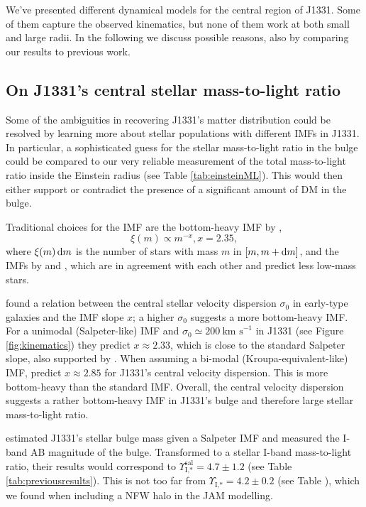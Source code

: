 We've presented different dynamical models for the central region of J1331. Some of them capture the observed kinematics, but none of them work at both small and large radii. In the following we discuss possible reasons, also by comparing our results to previous work.

\subsection{On J1331's central stellar mass-to-light ratio} \label{sec:MLdiscussion}

Some of the ambiguities in recovering J1331's matter distribution could be resolved by learning more about stellar populations with different IMFs in J1331. In particular, a sophisticated guess for the stellar mass-to-light ratio in the bulge could be compared to our very reliable measurement of the total mass-to-light ratio inside the Einstein radius (see Table \ref{tab:einsteinML}). This would then either support or contradict the presence of a significant amount of DM in the bulge.

Traditional choices for the IMF are the bottom-heavy IMF by \citet{Salpeter1955},
$$\xi(m) \propto m^{-x}, x=2.35,$$
where $\xi(m) \mathop{}\!\mathrm{d} m$ is the number of stars with mass $m$ in $[m,m+\mathop{}\!\mathrm{d} m]$, and the IMFs by \citet{2002Sci...295...82K} and \citet{Chabrier2003}, which are in agreement with each other and predict less low-mass stars.

\citet{Ferreras} found a relation between the central stellar velocity dispersion $\sigma_0$ in early-type galaxies and the IMF slope $x$; a higher $\sigma_0$ suggests a more bottom-heavy IMF. For a unimodal (Salpeter-like) IMF and $\sigma_0 \simeq 200~\text{km s}^{-1}$ in J1331 (see Figure \ref{fig:kinematics}) they predict $x \approx 2.33$, which is close to the standard Salpeter slope, also supported by \citet{2014MNRAS.438.1483S}. When assuming a bi-modal (Kroupa-equivalent-like) IMF, \citet{Ferreras} predict $x \approx 2.85$ for J1331's central velocity dispersion. This is more bottom-heavy than the standard \citet{2002Sci...295...82K} IMF. Overall, the central velocity dispersion suggests a rather bottom-heavy IMF in J1331's bulge and therefore large stellar mass-to-light ratio. 

\citet{SWELLSI} estimated J1331's stellar bulge mass given a Salpeter IMF and measured the I-band AB magnitude of the bulge. Transformed to a stellar I-band mass-to-light ratio, their results would correspond to $\Upsilon_\text{I,*}^\text{sal} = 4.7 \pm 1.2$ (see Table \ref{tab:previousresults}). This is not too far from $\Upsilon_\text{I,*} = 4.2 \pm 0.2$ (see Table \Wilma{[TO DO]}), which we found when including a NFW halo in the JAM modelling.


